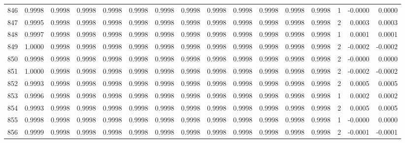 \begin{tabular}{lrrrrrrrrrrrrrrr}
846 &      0.9998 &  0.9998 &  0.9998 &  0.9998 &  0.9998 &  0.9998 &  0.9998 &  0.9998 &  0.9998 &  0.9998 &   0.9998 &     0.9998 &      1 &                   -0.0000 &                     0.0000 \\
847 &      0.9995 &  0.9998 &  0.9998 &  0.9998 &  0.9998 &  0.9998 &  0.9998 &  0.9998 &  0.9998 &  0.9998 &   0.9998 &     0.9998 &      2 &                    0.0003 &                     0.0003 \\
848 &      0.9997 &  0.9998 &  0.9998 &  0.9998 &  0.9998 &  0.9998 &  0.9998 &  0.9998 &  0.9998 &  0.9998 &   0.9998 &     0.9998 &      1 &                    0.0001 &                     0.0001 \\
849 &      1.0000 &  0.9998 &  0.9998 &  0.9998 &  0.9998 &  0.9998 &  0.9998 &  0.9998 &  0.9998 &  0.9998 &   0.9998 &     0.9998 &      2 &                   -0.0002 &                    -0.0002 \\
850 &      0.9998 &  0.9998 &  0.9998 &  0.9998 &  0.9998 &  0.9998 &  0.9998 &  0.9998 &  0.9998 &  0.9998 &   0.9998 &     0.9998 &      2 &                   -0.0000 &                     0.0000 \\
851 &      1.0000 &  0.9998 &  0.9998 &  0.9998 &  0.9998 &  0.9998 &  0.9998 &  0.9998 &  0.9998 &  0.9998 &   0.9998 &     0.9998 &      2 &                   -0.0002 &                    -0.0002 \\
852 &      0.9993 &  0.9998 &  0.9998 &  0.9998 &  0.9998 &  0.9998 &  0.9998 &  0.9998 &  0.9998 &  0.9998 &   0.9998 &     0.9998 &      2 &                    0.0005 &                     0.0005 \\
853 &      0.9996 &  0.9998 &  0.9998 &  0.9998 &  0.9998 &  0.9998 &  0.9998 &  0.9998 &  0.9998 &  0.9998 &   0.9998 &     0.9998 &      1 &                    0.0002 &                     0.0002 \\
854 &      0.9993 &  0.9998 &  0.9998 &  0.9998 &  0.9998 &  0.9998 &  0.9998 &  0.9998 &  0.9998 &  0.9998 &   0.9998 &     0.9998 &      2 &                    0.0005 &                     0.0005 \\
855 &      0.9998 &  0.9998 &  0.9998 &  0.9998 &  0.9998 &  0.9998 &  0.9998 &  0.9998 &  0.9998 &  0.9998 &   0.9998 &     0.9998 &      1 &                   -0.0000 &                     0.0000 \\
856 &      0.9999 &  0.9998 &  0.9998 &  0.9998 &  0.9998 &  0.9998 &  0.9998 &  0.9998 &  0.9998 &  0.9998 &   0.9998 &     0.9998 &      2 &                   -0.0001 &                    -0.0001 \\

\end{tabular}
